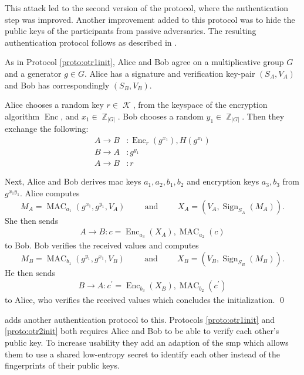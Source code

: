 \documentclass[draft]{llncs}
\DeclareMathOperator{\sign}{\mathrm{Sign}}
\DeclareMathOperator{\enc}{\mathrm{Enc}}
\DeclareMathOperator{\mac}{\mathrm{MAC}}
\newcommand{\ord}[1]{|#1|}
\DeclareMathOperator{\Z}{\mathbb Z}
\DeclareMathOperator{\K}{\mathcal K}
\DeclareMathOperator{\textand}{\qquad and\qquad}
\begin{document}
This attack led to the second version of the protocol, where the authentication 
step was improved.
Another improvement added to this protocol was to hide the public keys of the 
participants from passive adversaries.
The resulting authentication protocol follows as described in \cite{otr2007}.

\begin{protocol}
  \label{proto:otr2init}
  As in Protocol \ref{proto:otr1init}, Alice and Bob agree on a multiplicative 
  group \(G\) and a generator \(g\in G\).
  Alice has a signature and verification key-pair \((S_A, V_A)\) and Bob has 
  correspondingly \((S_B, V_B)\).

  Alice chooses a random key \(r\in \K\), from the keyspace of the encryption 
  algorithm \(\enc\), and \(x_1\in \Z_{\ord G}\).
  Bob chooses a random \(y_1\in \Z_{\ord G}\).
  Then they exchange the following:
  \begin{align*}
    A\to B &\colon \enc_r( g^{x_1} ), H( g^{x_1} ) \\
    B\to A &\colon g^{y_1} \\
    A\to B &\colon r
  \end{align*}

  Next, Alice and Bob derives \ac{mac} keys \(a_1, a_2, b_1, b_2\) and 
  encryption keys \(a_3, b_3\) from \(g^{x_1 y_1}\).
  Alice computes \[M_A = \mac_{a_1}( g^{x_1}, g^{y_1}, V_A )\textand X_A 
  = ( V_A, \sign_{S_A}( M_A ) ).\]
  She then sends
  \begin{align*}
    A\to B\colon c = \enc_{a_3}( X_A ), \mac_{a_2}( c )
  \end{align*}
  to Bob.
  Bob verifies the received values and computes \[M_B = \mac_{b_1}( g^{y_1}, 
  g^{x_1}, V_B )\textand X_B = ( V_B, \sign_{S_B}( M_B ) ).\]
  He then sends
  \begin{align*}
    B\to A\colon c^\prime = \enc_{b_3}( X_B ), \mac_{b_2}( c^\prime )
  \end{align*}
  to Alice, who verifies the received values which concludes the 
  initialization.
  \qed
\end{protocol}

\citeauthor{otr2007} \cite{otr2007} adds another authentication protocol to 
this.
Protocols \ref{proto:otr1init} and \ref{proto:otr2init} both requires Alice and 
Bob to be able to verify each other's public key.
To increase usability they add an adaption of the \ac{smp} \cite{smp} which 
allows them to use a shared low-entropy secret to identify each other instead 
of the fingerprints of their public keys.
\end{document}
